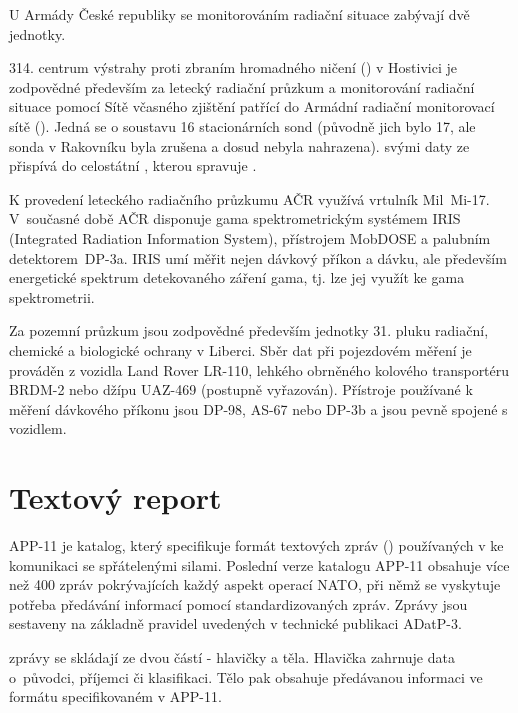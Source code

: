 U Armády České republiky se monitorováním radiační situace zabývají
dvě jednotky.
	 
314. centrum výstrahy proti zbraním hromadného ničení () v
Hostivici je zodpovědné především za letecký radiační průzkum a
monitorování radiační situace pomocí Sítě včasného zjištění patřící do
Armádní radiační monitorovací sítě (). Jedná se o
soustavu 16 stacionárních sond (původně jich bylo 17, ale sonda v
Rakovníku byla zrušena a dosud nebyla nahrazena).  svými daty
ze~ přispívá do celostátní , kterou spravuje
.
	 
K provedení leteckého radiačního průzkumu AČR využívá vrtulník 
Mil~Mi-17. V~současné době AČR disponuje gama spektrometrickým systémem
IRIS (Integrated Radiation Information System), přístrojem MobDOSE a
palubním detektorem~DP-3a. IRIS umí měřit nejen dávkový příkon a
dávku, ale především energetické spektrum detekovaného záření gama,
tj. lze jej využít ke gama spektrometrii.
	
Za pozemní průzkum jsou zodpovědné především jednotky 31. pluku
radiační, chemické a biologické ochrany v Liberci. Sběr dat při
pojezdovém měření je prováděn z vozidla Land Rover LR-110, lehkého
obrněného kolového transportéru BRDM-2 nebo džípu UAZ-469 (postupně
vyřazován). Přístroje používané k měření dávkového příkonu jsou DP-98,
AS-67 nebo DP-3b a jsou pevně spojené s vozidlem.
	 
	 
\section{Textový report}

APP-11 je katalog, který specifikuje formát textových zpráv ()
používaných v  ke komunikaci se spřátelenými silami. Poslední
verze katalogu APP-11 obsahuje více než 400 zpráv pokrývajících každý
aspekt operací NATO, při němž se vyskytuje potřeba předávání informací
pomocí standardizovaných zpráv. Zprávy jsou sestaveny na základně
pravidel uvedených v technické publikaci ADatP-3.

 zprávy se skládají ze dvou částí - hlavičky a těla. Hlavička
zahrnuje data o~původci, příjemci či klasifikaci. Tělo pak obsahuje
předávanou informaci ve formátu specifikovaném v APP-11.

